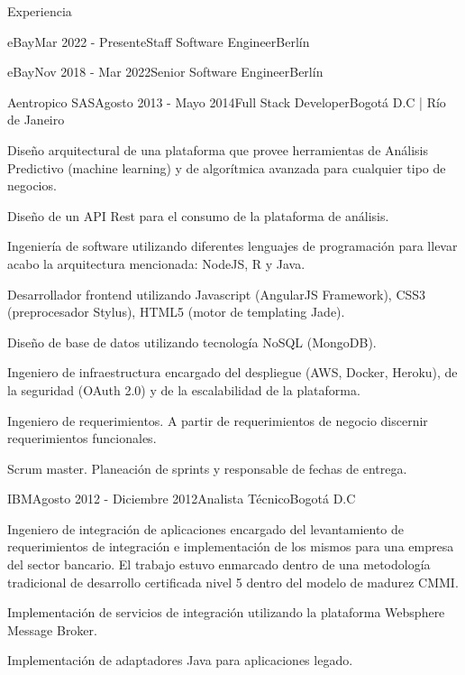 \documentclass[spanish]{resume} %
\begin{document}
\begin{rSection}{Experiencia}
\begin{rSubsection}{eBay}{Mar 2022 - Presente}{Staff Software Engineer}{Berl\'in}
\begin{rSubsection}{eBay}{Nov 2018 - Mar 2022}{Senior Software Engineer}{Berl\'in}
\begin{rSubsection}{Aentropico SAS}{Agosto 2013 - Mayo 2014}{Full Stack Developer}{Bogot\'a D.C | R\'io de Janeiro}
\item Dise\~no arquitectural de una plataforma que provee herramientas de An\'alisis Predictivo (machine learning) y de algor\'itmica avanzada para cualquier tipo de negocios.
\item Dise\~no de un API Rest para el consumo de la plataforma de an\'alisis.
\item Ingenier\'ia de software utilizando diferentes lenguajes de programaci\'on para llevar acabo la arquitectura mencionada: NodeJS, R y Java.
\item Desarrollador frontend utilizando Javascript (AngularJS Framework), CSS3 (preprocesador Stylus), HTML5 (motor de templating Jade).
\item Dise\~no de base de datos utilizando tecnolog\'ia NoSQL (MongoDB).
\item Ingeniero de infraestructura encargado del despliegue (AWS, Docker, Heroku), de la seguridad (OAuth 2.0) y de la escalabilidad de la plataforma.
\item Ingeniero de requerimientos. A partir de requerimientos de negocio discernir requerimientos funcionales.
\item Scrum master. Planeaci\'on de sprints y responsable de fechas de entrega.
\end{rSubsection}


\begin{rSubsection}{IBM}{Agosto 2012 - Diciembre 2012}{Analista T\'ecnico}{Bogot\'a D.C}
\item Ingeniero de integraci\'on de aplicaciones encargado del levantamiento de requerimientos de integraci\'on e implementaci\'on de los mismos para una empresa del sector bancario. El trabajo estuvo enmarcado dentro de una metodolog\'ia tradicional de desarrollo certificada nivel 5 dentro del modelo de madurez CMMI.
\item Implementaci\'on de servicios de integraci\'on utilizando la plataforma Websphere Message Broker.
\item Implementaci\'on de adaptadores Java para aplicaciones legado.
\end{rSubsection}



\end{rSubsection}
\end{rSubsection}
\end{rSection}
\end{document}
